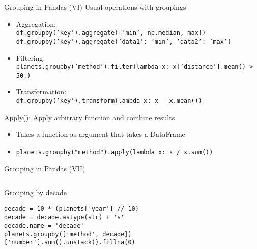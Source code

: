 \documentclass[10pt,compress]{beamer} %
\begin{document}
\begin{frame}{Grouping in Pandas (VI)}
	Usual operations with groupings
	\begin{itemize}
		\item Aggregation: \\
			\texttt{df.groupby('key').aggregate(['min', np.median, max])}\\
			\texttt{df.groupby('key').aggregate({'data1': 'min', 'data2': 'max'})}
		\item Filtering: \\
			\texttt{planets.groupby('method').filter(lambda x: x['distance'].mean() > 50.)}
		\item Transformation: \\
			\texttt{df.groupby('key').transform(lambda x: x - x.mean())}
	\end{itemize}
	Apply(): Apply arbitrary function and combine results
		\begin{itemize}
			\item Takes a function as argument that takes a DataFrame
			\item[] \texttt{planets.groupby("method").apply(lambda x: x / x.sum())}
		\end{itemize}
\end{frame}

\begin{frame}[fragile]{Grouping in Pandas (VII)}
	\begin{columns}
	\begin{exampleblock}{Grouping by decade}
	\vspace{-0.2cm} 
		\begin{lstlisting}
decade = 10 * (planets['year'] // 10)
decade = decade.astype(str) + 's'
decade.name = 'decade'
planets.groupby(['method', decade])['number'].sum().unstack().fillna(0)
\end{lstlisting}
		\vspace{-0.2cm} 
	\end{exampleblock}
	\end{columns}
\end{frame}
\end{document}
